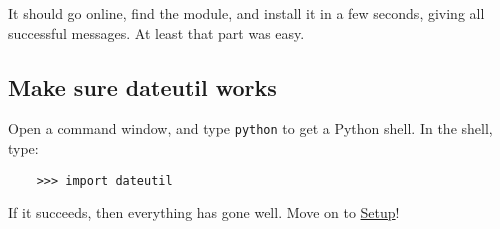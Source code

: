 It should go online, find the module, and install it in a few seconds,
giving all successful messages. At least that part was easy.


\subsection{Make sure dateutil works}

Open a command window, and type \verb=python= to get a Python shell. In
the shell, type:

\begin{verbatim}
    >>> import dateutil
\end{verbatim}

If it succeeds, then everything has gone well. Move on to \hyperlink{setup}{Setup}!
